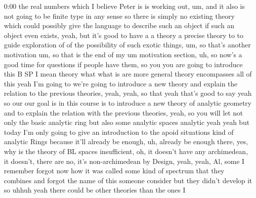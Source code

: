 \begin{unfinished}{0:00}
the real numbers which I believe Peter is is working out, um, and it also is not going to be finite type in any sense so there is simply no existing theory which could possibly give the language to describe such an object if such an object even exists, yeah, but it's good to have a a theory a precise theory to to guide exploration of of the possibility of such exotic things, um, so that's another motivation um, so that is the end of my um motivation section, uh, so now's a good time for questions if people have them, so you you are going to introduce this B SP I mean theory what what is are more general theory encompasses all of this yeah I'm going to we're going to introduce a new theory and explain the relation to the previous theories, yeah, yeah, so that yeah that's good to say yeah so our our goal is in this course is to introduce a new theory of analytic geometry and to explain the relation with the previous theories, yeah, so you will let not only the basic analytic ring but also some analytic spaces analytic yeah yeah but today I'm only going to give an introduction to the apoid situations kind of analytic Rings because it'll already be enough, uh, already be enough there, yes, why is the theory of BL spaces insufficient, oh, it doesn't have any archimedean, it doesn't, there are no, it's non-archimedean by Design, yeah, yeah, Al, some I remember forgot now how it was called some kind of spectrum that they combines and forgot the name of this someone consider but they didn't develop it so uhhuh yeah there could be other theories than the ones I


\end{unfinished}
